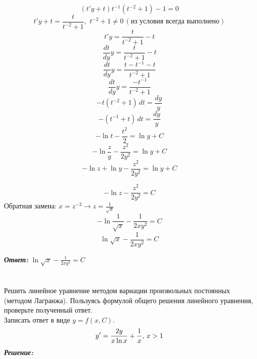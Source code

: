 \documentclass[a5paper, 10pt]{article}
\theoremstyle{definition}
\theoremstyle{plain}
\theoremstyle{remark}
\begin{document}
\begin{equation*}
(t'y + t) t^{-1}(t^{-2}+ 1) -1 = 0 
\end{equation*}
\begin{equation*}
t'y + t= \frac{t}{t^{-2}+ 1}, \, \, t^{-2}+ 1 \neq 0 \, (\textit{из условия всегда выполнено})
\end{equation*}
\begin{equation*}
t'y = \frac{t}{t^{-2}+ 1} - t
\end{equation*}
\begin{equation*}
\frac{dt}{dy}y = \frac{t}{t^{-2}+ 1} - t
\end{equation*}
\begin{equation*}
\frac{dt}{dy}y = \frac{t - t^{-1}- t }{t^{-2}+ 1} 
\end{equation*}
\begin{equation*}
\frac{dt}{dy}y = \frac{- t^{-1}}{t^{-2}+ 1} 
\end{equation*}
\begin{equation*}
-t(t^{-2}+ 1) \, dt  = \frac{dy}{y}
\end{equation*}
\begin{equation*}
-(t^{-1} + t) \, dt  = \frac{dy}{y}
\end{equation*}
\begin{equation*}
- \ln t - \frac{t^2}{2}  = \ln y + C
\end{equation*}
\begin{equation*}
- \ln \frac{z}{y} - \frac{z^2}{2y^2}  = \ln y + C
\end{equation*}
\begin{equation*}
- \ln z +  \ln y - \frac{z^2}{2y^2}  = \ln y + C
\end{equation*}

\begin{equation*}
- \ln z  - \frac{z^2}{2y^2}  =  C
\end{equation*}
Обратная замена: $x = z^{-2} \to z = \frac{1}{\sqrt{x}}$
\begin{equation*}
- \ln \frac{1}{\sqrt{x}}   - \frac{1}{2xy^2}  =  C
\end{equation*}
\begin{equation*}
 \ln \sqrt{x}   - \frac{1}{2xy^2}  =  C
\end{equation*}

\textit{\textbf{Ответ:}} $\ln \sqrt{x}   - \frac{1}{2xy^2}  =  C$



\newpage
\section{}
Решить линейное уравнение методом вариации произвольных постоянных (методом Лагранжа). Пользуясь формулой общего решения линейного уравнения, проверьте полученный ответ.\\
Записать ответ в виде $y = f(x, C).$
\begin{equation*}
y' = \frac{2y}{x \ln x} + \frac{1}{x}, \, x > 1\\
\end{equation*}
\textit{\textbf{Решение:}}\\
\end{document}
